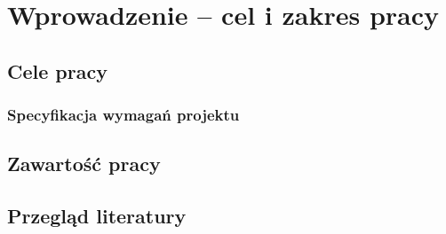 \chapter{Wprowadzenie -- cel i zakres pracy}
\label{cha:intro}

\section{Cele pracy}
\label{sec:celePracy}
\subsection{Specyfikacja wymagań projektu}

\section{Zawartość pracy}
\label{sec:zawartoscPracy}

\section{Przegląd literatury}